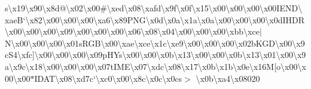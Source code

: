 s\textbackslash{}x19\textbackslash{}x90\textbackslash{}x8d@\textbackslash{}x02\textbackslash{}x00\#\textbackslash{}xed\textbackslash{}x08\textbackslash{}xafd\textbackslash{}x9f\textbackslash{}x0f\textbackslash{}x15\textbackslash{}x00\textbackslash{}x00\textbackslash{}x00\textbackslash{}x00\+I\+E\+N\+D\textbackslash{}xae\+B`\textbackslash{}x82\textbackslash{}x00\textbackslash{}x00\textbackslash{}x00\textbackslash{}xa6\textbackslash{}x89\+P\+N\+G\textbackslash{}x0d\textbackslash{}x0a\textbackslash{}x1a\textbackslash{}x0a\textbackslash{}x00\textbackslash{}x00\textbackslash{}x00\textbackslash{}x0d\+I\+H\+D\+R\textbackslash{}x00\textbackslash{}x00\textbackslash{}x00\textbackslash{}x09\textbackslash{}x00\textbackslash{}x00\textbackslash{}x00\textbackslash{}x06\textbackslash{}x08\textbackslash{}x04\textbackslash{}x00\textbackslash{}x00\textbackslash{}x00\textbackslash{}xbb\textbackslash{}xce$\vert$\+N\textbackslash{}x00\textbackslash{}x00\textbackslash{}x00\textbackslash{}x01s\+R\+G\+B\textbackslash{}x00\textbackslash{}xae\textbackslash{}xce\textbackslash{}x1c\textbackslash{}xe9\textbackslash{}x00\textbackslash{}x00\textbackslash{}x00\textbackslash{}x02b\+K\+G\+D\textbackslash{}x00\textbackslash{}x9c\+S4\textbackslash{}xfc\mbox{]}\textbackslash{}x00\textbackslash{}x00\textbackslash{}x00\textbackslash{}x09p\+H\+Ys\textbackslash{}x00\textbackslash{}x00\textbackslash{}x0b\textbackslash{}x13\textbackslash{}x00\textbackslash{}x00\textbackslash{}x0b\textbackslash{}x13\textbackslash{}x01\textbackslash{}x00\textbackslash{}x9a\textbackslash{}x9c\textbackslash{}x18\textbackslash{}x00\textbackslash{}x00\textbackslash{}x00\textbackslash{}x07t\+I\+M\+E\textbackslash{}x07\textbackslash{}xdc\textbackslash{}x08\textbackslash{}x17\textbackslash{}x0b\textbackslash{}x1b\textbackslash{}x0e\textbackslash{}x16\+M\mbox{[}o\textbackslash{}x00\textbackslash{}x00\textbackslash{}x00$\ast$\+I\+D\+A\+T\textbackslash{}x08\textbackslash{}xd7c`\textbackslash{}xc0\textbackslash{}x00\textbackslash{}x8c\textbackslash{}x0c\textbackslash{}x0cs$>$ \textbackslash{}x0b\textbackslash{}xa4\textbackslash{}x08020 